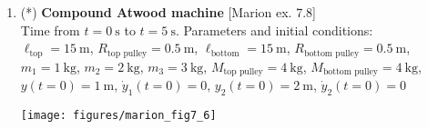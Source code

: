 \documentclass[11pt, a4paper, twoside]{article}
\begin{document}
\begin{enumerate}
\item
\begin{minipage}[t][2cm]{0.65\textwidth}
(*) \textbf{Compound Atwood machine} [Marion ex. 7.8]\\
	Time from \(t = \SI{0}{\second}\) to \(t = \SI{5}{\second}\). Parameters and initial conditions:\\
\(\ell_\text{top} = \SI{15}{\metre}\), 
\(R_{\text{top pulley}} = \SI{0.5}{\metre}\), 
\(\ell_\text{bottom} = \SI{15}{\metre}\), 
\(R_{\text{bottom pulley}} = \SI{0.5}{\metre}\),\\ 
\(m_1 = \SI{1}{\kilo\gram}\),
\(m_2 = \SI{2}{\kilo\gram}\),
\(m_3 = \SI{3}{\kilo\gram}\),
\(M_{\text{top pulley}} = \SI{4}{\kilo\gram}\),
\(M_{\text{bottom pulley}} = \SI{4}{\kilo\gram}\),\\
\(y(t=0) = \SI{1}{\metre}\), \(\dot{y}_1(t=0) = 0\),
\(y_2(t=0) = \SI{2}{\metre}\), \(\dot{y}_2(t=0) = 0\)
\end{minipage}
\begin{minipage}[c][3cm][t]{0.3\textwidth}
	\texttt{[image: figures/marion\_fig7\_6]}
\end{minipage}

\end{enumerate}
\end{document}
